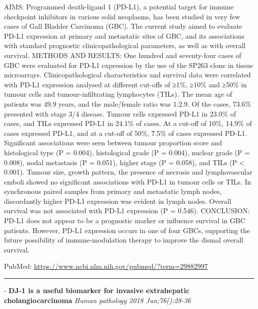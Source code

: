 \documentclass[]{article}
\begin{document}
AIMS: Programmed death-ligand 1 (PD-L1), a potential target for immune
checkpoint inhibitors in various solid neoplasms, has been studied in
very few cases of Gall Bladder Carcinoma (GBC). The current study aimed
to evaluate PD-L1 expression at primary and metastatic sites of GBC, and
its associations with standard prognostic clinicopathological
parameters, as well as with overall survival. METHODS AND RESULTS: One
hundred and seventy-four cases of GBC were evaluated for PD-L1
expression by the use of the SP263 clone in tissue microarrays.
Clinicopathological characteristics and survival data were correlated
with PD-L1 expression analysed at different cut-offs of ≥1\%, ≥10\% and
≥50\% in tumour cells and tumour-infiltrating lymphocytes (TILs). The
mean age of patients was 49.9 years, and the male/female ratio was
1:2.9. Of the cases, 73.6\% presented with stage 3/4 disease. Tumour
cells expressed PD-L1 in 23.0\% of cases, and TILs expressed PD-L1 in
24.1\% of cases. At a cut-off of 10\%, 14.9\% of cases expressed PD-L1,
and at a cut-off of 50\%, 7.5\% of cases expressed PD-L1. Significant
associations were seen between tumour proportion score and histological
type (P = 0.004), histological grade (P = 0.004), nuclear grade (P =
0.008), nodal metastasis (P = 0.051), higher stage (P = 0.058), and TILs
(P \textless{} 0.001). Tumour size, growth pattern, the presence of
necrosis and lymphovascular emboli showed no significant associations
with PD-L1 in tumour cells or TILs. In synchronous paired samples from
primary and metastatic lymph nodes, discordantly higher PD-L1 expression
was evident in lymph nodes. Overall survival was not associated with
PD-L1 expression (P = 0.546). CONCLUSION: PD-L1 does not appear to be a
prognostic marker or influence survival in GBC patients. However, PD-L1
expression occurs in one of four GBCs, supporting the future possibility
of immune-modulation therapy to improve the dismal overall survival.

PubMed: \url{https://www.ncbi.nlm.nih.gov/pubmed/?term=29882997}

{}

{}

\begin{center}\rule{0.5\linewidth}{\linethickness}\end{center}

 - \textbf{DJ-1 is a useful biomarker for invasive extrahepatic
cholangiocarcinoma} \emph{Human pathology 2018 Jun;76():28-36}
\end{document}
